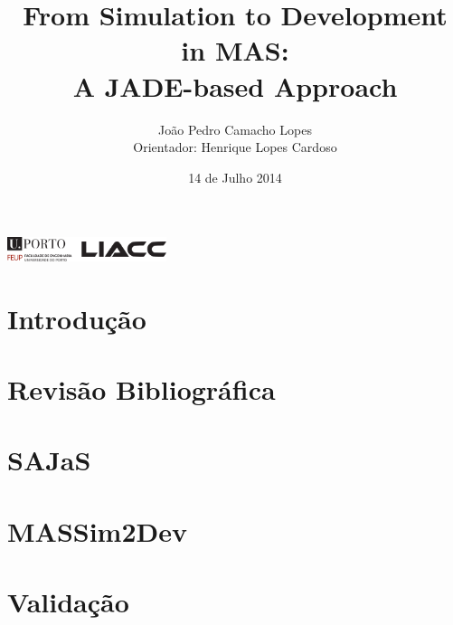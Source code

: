 \documentclass[xcolor=x11names,compress]{beamer}
\title{\texorpdfstring{From Simulation to Development in MAS:\\
		A JADE-based Approach}{}}
\author{\texorpdfstring{João Pedro Camacho Lopes\\
		Orientador: Henrique Lopes Cardoso}{}}
\renewcommand{\(}{\begin{columns}}
\renewcommand{\)}{\end{columns}}
\newcommand{\<}[1]{\begin{column}{#1}}
\renewcommand{\>}{\end{column}}
\begin{document}
\begin{frame}
\includegraphics[height=0.7cm]{figures/uporto-feup.pdf}\\

\vspace{1cm}

\date{14 de Julho 2014}
\titlepage
\end{frame}

\section{Introdução}


\section{Revisão Bibliográfica}


\section{SAJaS}


\section{MASSim2Dev}


\section{Validação}

\end{document}
